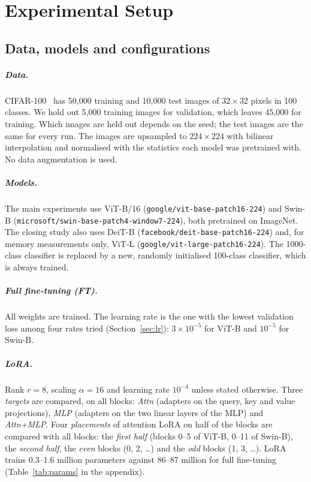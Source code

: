 \chapter{Experimental Setup}
\label{ch:setup}

\section{Data, models and configurations}

\paragraph{Data.} CIFAR-100~\cite{krizhevsky2009cifar} has 50,000 training and 10,000 test images of
$32\times32$ pixels in 100 classes. We hold out 5,000 training images for validation, which leaves 45,000 for
training. Which images are held out depends on the seed; the test images are the same for every run. The images are
upsampled to $224\times224$ with bilinear interpolation and normalised with the statistics each model was pretrained
with. No data augmentation is used.

\paragraph{Models.} The main experiments use ViT-B/16 (\texttt{google/vit-base-patch16-224}) and Swin-B
(\texttt{microsoft/swin-base-patch4-window7-224}), both pretrained on ImageNet. The closing study also uses DeiT-B
(\texttt{facebook/deit-base-patch16-224}) and, for memory measurements only, ViT-L
(\texttt{google/vit-large-patch16-224}). The 1000-class classifier is replaced by a new, randomly initialised
100-class classifier, which is always trained.

\paragraph{Full fine-tuning (FT).} All weights are trained. The learning rate is the one with the lowest
validation loss among four rates tried (Section~\ref{sec:lr}): $3\times10^{-5}$ for ViT-B and $10^{-5}$ for Swin-B.

\paragraph{LoRA.} Rank $r=8$, scaling $\alpha=16$ and learning rate $10^{-4}$ unless stated otherwise. Three
\emph{targets} are compared, on all blocks: \emph{Attn} (adapters on the query, key and value projections),
\emph{MLP} (adapters on the two linear layers of the MLP) and \emph{Attn+MLP}. Four \emph{placements} of attention
LoRA on half of the blocks are compared with all blocks: the \emph{first half} (blocks 0--5 of ViT-B, 0--11 of
Swin-B), the \emph{second half}, the \emph{even} blocks (0, 2, \ldots) and the \emph{odd} blocks (1, 3, \ldots).
LoRA trains 0.3--1.6 million parameters against 86--87 million for full fine-tuning (Table~\ref{tab:params} in the
appendix).

